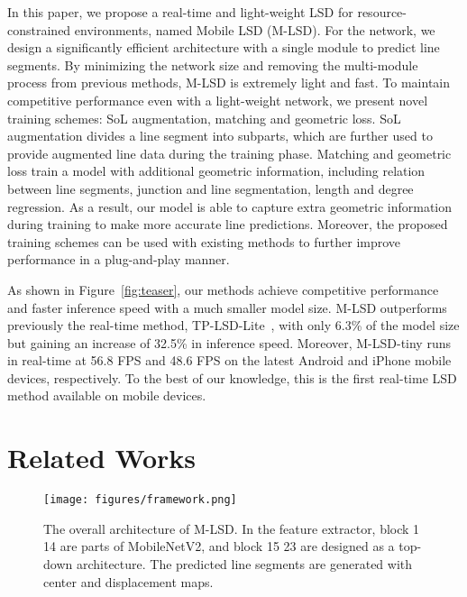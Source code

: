 \documentclass[letterpaper]{article} \usepackage{aaai22}  \usepackage{times}  \usepackage{helvet}  \usepackage{courier}  \usepackage[hyphens]{url}  \usepackage{graphicx} \urlstyle{rm} \def\UrlFont{\rm}  \usepackage{natbib}  \usepackage{caption} \DeclareCaptionStyle{ruled}{labelfont=normalfont,labelsep=colon,strut=off} \frenchspacing  \setlength{\pdfpagewidth}{8.5in}  \setlength{\pdfpageheight}{11in}  \usepackage{algorithm}
\begin{document}
In this paper, we propose a real-time and light-weight LSD for resource-constrained environments, named Mobile LSD (M-LSD).
For the network, we design a significantly efficient architecture with a single module to predict line segments.
By minimizing the network size and removing the multi-module process from previous methods, M-LSD is extremely light and fast.
To maintain competitive performance even with a light-weight network, we present novel training schemes: SoL augmentation, matching and geometric loss.
SoL augmentation divides a line segment into subparts, which are further used to provide augmented line data during the training phase.
Matching and geometric loss train a model with additional geometric information, including relation between line segments, junction and line segmentation, length and degree regression.
As a result, our model is able to capture extra geometric information during training to make more accurate line predictions.
Moreover, the proposed training schemes can be used with existing methods to further improve performance in a plug-and-play manner.

As shown in Figure~\ref{fig:teaser}, our methods achieve competitive performance and faster inference speed with a much smaller model size.
M-LSD outperforms previously the real-time method, TP-LSD-Lite~\cite{huang2020tp}, with only 6.3\% of the model size but gaining an increase of 32.5\% in inference speed.
Moreover, M-LSD-tiny runs in real-time at 56.8 FPS and 48.6 FPS on the latest Android and iPhone mobile devices, respectively.
To the best of our knowledge, this is the first real-time LSD method available on mobile devices.

\section{Related Works}

\begin{comment}
\begin{figure}[t!]
\centering
\texttt{[image: figures/framework\_vertical.png]}
\caption{An overview of M-LSD network architecture. The final feature maps are extracted from the feature extractor, which consists of TP, SoL, and segmentation maps. The predicted line segments are generated by merging center points and displacement vectors from the TP maps.}
\label{fig:framework}
\end{figure}
\end{comment}

\begin{figure*}[t!]
\centering
\texttt{[image: figures/framework.png]}
\caption{The overall architecture of M-LSD. In the feature extractor, block 1  14 are parts of MobileNetV2, and block 15  23 are designed as a top-down architecture. The predicted line segments are generated with center and displacement maps.}
\label{fig:framework}
\end{figure*}
\end{document}
